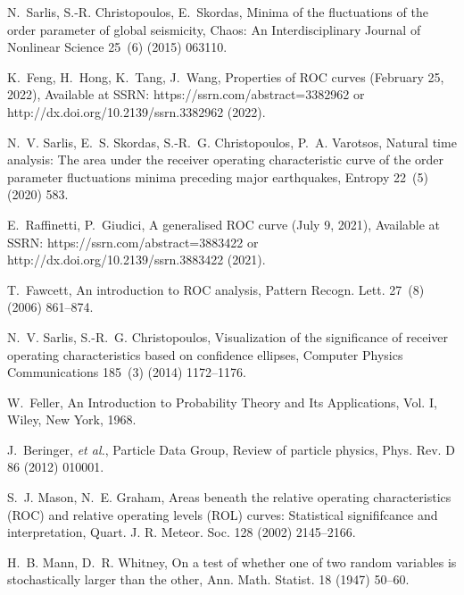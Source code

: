 \documentclass[preprint,12pt]{elsarticle}
\begin{document}
\begin{thebibliography}{10}
N.~Sarlis, S.-R. Christopoulos, E.~Skordas, Minima of the fluctuations of the
  order parameter of global seismicity, Chaos: An Interdisciplinary Journal of
  Nonlinear Science 25~(6) (2015) 063110.

K.~Feng, H.~Hong, K.~Tang, J.~Wang, Properties of {ROC} curves ({February 25},
  2022), Available at SSRN: https://ssrn.com/abstract=3382962 or
  http://dx.doi.org/10.2139/ssrn.3382962 (2022).

N.~V. Sarlis, E.~S. Skordas, S.-R.~G. Christopoulos, P.~A. Varotsos, Natural
  time analysis: The area under the receiver operating characteristic curve of
  the order parameter fluctuations minima preceding major earthquakes, Entropy
  22~(5) (2020) 583.

E.~Raffinetti, P.~Giudici, A generalised {ROC} curve ({July} 9, 2021),
  Available at SSRN: https://ssrn.com/abstract=3883422 or
  http://dx.doi.org/10.2139/ssrn.3883422 (2021).

T.~Fawcett, {An introduction to ROC analysis}, Pattern Recogn. Lett. 27~(8)
  (2006) 861--874.

N.~V. Sarlis, S.-R.~G. Christopoulos, Visualization of the significance of
  receiver operating characteristics based on confidence ellipses, Computer
  Physics Communications 185~(3) (2014) 1172--1176.

W.~Feller, An Introduction to Probability Theory and Its Applications, Vol. I,
  Wiley, New York, 1968.

J.~Beringer, {\em et al.}, {Particle Data Group}, Review of particle physics,
  Phys. Rev. D 86 (2012) 010001.

S.~J. Mason, N.~E. Graham, {Areas beneath the relative operating
  characteristics (ROC) and relative operating levels (ROL) curves: Statistical
  signififcance and interpretation}, Quart. J. R. Meteor. Soc. 128 (2002)
  2145--2166.

H.~B. Mann, D.~R. Whitney, On a test of whether one of two random variables is
  stochastically larger than the other, Ann. Math. Statist. 18 (1947) 50--60.

\end{thebibliography}

\end{document}
